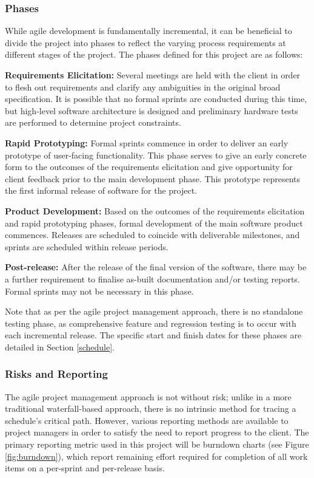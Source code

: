 \documentclass[12pt]{article}
\begin{document}
\subsubsection{Phases}\label{procphases}
While agile development is fundamentally incremental, it can be beneficial to divide the project into phases to reflect the varying process requirements at different stages of the project. The phases defined for this project are as follows:
\begin{description}
\item{\textbf{Requirements Elicitation:}} Several meetings are held with the client in order to flesh out requirements and clarify any ambiguities in the original broad specification. It is possible that no formal sprints are conducted during this time, but high-level software architecture is designed and preliminary hardware tests are performed to determine project constraints.
\item{\textbf{Rapid Prototyping:}} Formal sprints commence in order to deliver an early prototype of user-facing functionality. This phase serves to give an early concrete form to the outcomes of the requirements elicitation and give opportunity for client feedback prior to the main development phase. This prototype represents the first informal release of software for the project.
\item{\textbf{Product Development:}} Based on the outcomes of the requirements elicitation and rapid prototyping phases, formal development of the main software product commences. Releases are scheduled to coincide with deliverable milestones, and sprints are scheduled within release periods.
\item{\textbf{Post-release:}} After the release of the final version of the software, there may be a further requirement to finalise as-built documentation and/or testing reports. Formal sprints may not be necessary in this phase.
\end{description}

Note that as per the agile project management approach, there is no standalone testing phase, as comprehensive feature and regression testing is to occur with each incremental release. The specific start and finish dates for these phases are detailed in Section \ref{schedule}.

\subsubsection{Risks and Reporting}\label{agilerisk}
The agile project management approach is not without risk; unlike in a more traditional waterfall-based approach, there is no intrinsic method for tracing a schedule's critical path. However, various reporting methods are available to project managers in order to satisfy the need to report progress to the client. The primary reporting metric used in this project will be burndown charts (see Figure \ref{fig:burndown}), which report remaining effort required for completion of all work items on a per-sprint and per-release basis. 
\end{document}

